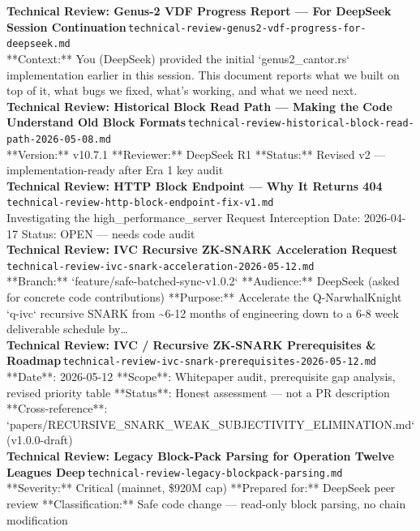 \documentclass[11pt,a4paper]{article}
\begin{document}
\noindent\textbf{Technical Review: Genus-2 VDF Progress Report --- For DeepSeek Session Continuation}\,\textcolor{qgray}{\small \texttt{technical-review-genus2-vdf-progress-for-deepseek.md}}\\
**Context:** You (DeepSeek) provided the initial `genus2\_cantor.rs` implementation earlier in this session. This document reports what we built on top of it, what bugs we fixed, what's working, and what we need next.\\[6pt]
\noindent\textbf{Technical Review: Historical Block Read Path --- Making the Code Understand Old Block Formats}\,\textcolor{qgray}{\small \texttt{technical-review-historical-block-read-path-2026-05-08.md}}\\
**Version:** v10.7.1 **Reviewer:** DeepSeek R1 **Status:** Revised v2 --- implementation-ready after Era 1 key audit\\[6pt]
\noindent\textbf{Technical Review: HTTP Block Endpoint --- Why It Returns 404}\,\textcolor{qgray}{\small \texttt{technical-review-http-block-endpoint-fix-v1.md}}\\
Investigating the high\_performance\_server Request Interception Date: 2026-04-17 \textbar{} Status: OPEN --- needs code audit\\[6pt]
\noindent\textbf{Technical Review: IVC Recursive ZK-SNARK Acceleration Request}\,\textcolor{qgray}{\small \texttt{technical-review-ivc-snark-acceleration-2026-05-12.md}}\\
**Branch:** `feature/safe-batched-sync-v1.0.2` **Audience:** DeepSeek (asked for concrete code contributions) **Purpose:** Accelerate the Q-NarwhalKnight `q-ivc` recursive SNARK from \textasciitilde{}6-12 months of engineering down to a 6-8 week deliverable schedule by\ldots{}\\[6pt]
\noindent\textbf{Technical Review: IVC / Recursive ZK-SNARK Prerequisites \& Roadmap}\,\textcolor{qgray}{\small \texttt{technical-review-ivc-snark-prerequisites-2026-05-12.md}}\\
**Date**: 2026-05-12 **Scope**: Whitepaper audit, prerequisite gap analysis, revised priority table **Status**: Honest assessment --- not a PR description **Cross-reference**: `papers/RECURSIVE\_SNARK\_WEAK\_SUBJECTIVITY\_ELIMINATION.md` (v1.0.0-draft)\\[6pt]
\noindent\textbf{Technical Review: Legacy Block-Pack Parsing for Operation Twelve Leagues Deep}\,\textcolor{qgray}{\small \texttt{technical-review-legacy-blockpack-parsing.md}}\\
**Severity:** Critical (mainnet, \$920M cap) **Prepared for:** DeepSeek peer review **Classification:** Safe code change --- read-only block parsing, no chain modification\\[6pt]
\end{document}
